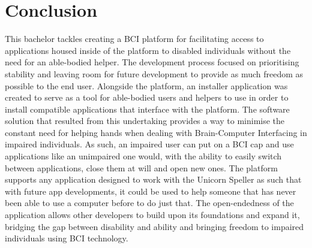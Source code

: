
\chapter{Conclusion}\label{cap:ending}
This bachelor tackles creating a BCI platform for facilitating access to applications housed inside of the platform to disabled individuals without the need for an able-bodied helper.
\vspace{\baselineskip}\newline
The development process focused on prioritising stability and leaving room for future development to provide as much freedom as possible to the end user. Alongside the platform, an installer application was created to serve as a tool for able-bodied users and helpers to use in order to install compatible applications that interface with the platform.
\vspace{\baselineskip}\newline
The software solution that resulted from this undertaking provides a way to minimise the constant need for helping hands when dealing with Brain-Computer Interfacing in impaired individuals. As such, an impaired user can put on a BCI cap and use applications like an unimpaired one would, with the ability to easily switch between applications, close them at will and open new ones. The platform supports any application designed to work with the Unicorn Speller as such that with future app developments, it could be used to help someone that has never been able to use a computer before to do just that. 
\vspace{\baselineskip}\newline
The open-endedness of the application allows other developers to build upon its foundations and expand it, bridging the gap between disability and ability and bringing freedom to impaired individuals using BCI technology.